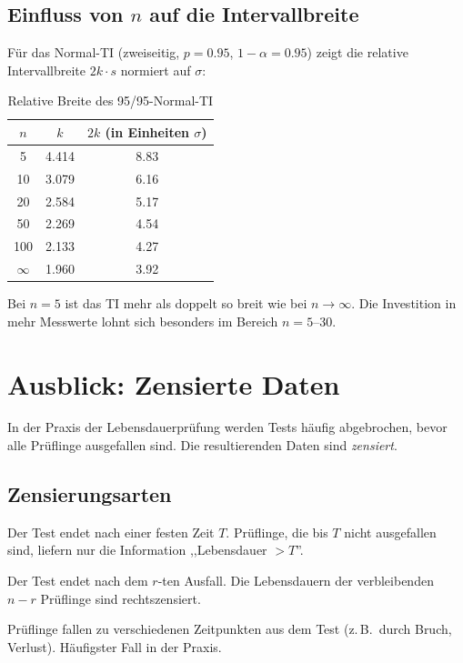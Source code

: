 \documentclass[10pt,a4paper,twocolumn]{article}
\theoremstyle{definition}
\begin{document}
\subsection{Einfluss von $n$ auf die Intervallbreite}

Für das Normal-TI (zweiseitig, $p=0.95$, $1-\alpha=0.95$)
zeigt  die relative Intervallbreite
$2k \cdot s$ normiert auf $\sigma$:

\begin{table}[H]
\centering
\caption{Relative Breite des 95/95-Normal-TI}
\label{tab:breite}
\small
\begin{tabular}{@{}ccc@{}}
\toprule
$n$ & $k$ & $2k$ (in Einheiten $\sigma$) \\
\midrule
5   & 4.414 & 8.83 \\
10  & 3.079 & 6.16 \\
20  & 2.584 & 5.17 \\
50  & 2.269 & 4.54 \\
100 & 2.133 & 4.27 \\
$\infty$ & 1.960 & 3.92 \\
\bottomrule
\end{tabular}
\end{table}

Bei $n = 5$ ist das TI mehr als doppelt so breit wie bei
$n \to \infty$. Die Investition in mehr Messwerte lohnt sich
besonders im Bereich $n = 5$--$30$.


\section{Ausblick: Zensierte Daten}
\label{sec:zensiert}

In der Praxis der Lebensdauerprüfung werden Tests häufig
abgebrochen, bevor alle Prüflinge ausgefallen sind. Die
resultierenden Daten sind \emph{zensiert}.

\subsection{Zensierungsarten}

\begin{description}[nosep,leftmargin=*,font=\bfseries]
    \item[Typ-I-Zensierung (zeitlich):] Der Test endet nach
        einer festen Zeit $T$. Prüflinge, die bis $T$ nicht
        ausgefallen sind, liefern nur die Information
        ,,Lebensdauer $> T$''.
    \item[Typ-II-Zensierung (anzahlbasiert):] Der Test endet
        nach dem $r$-ten Ausfall. Die Lebensdauern der
        verbleibenden $n - r$ Prüflinge sind rechtszensiert.
    \item[Zufällige Zensierung:] Prüflinge fallen zu
        verschiedenen Zeitpunkten aus dem Test (z.\,B.\ durch
        Bruch, Verlust). Häufigster Fall in der Praxis.
\end{description}
\end{document}

